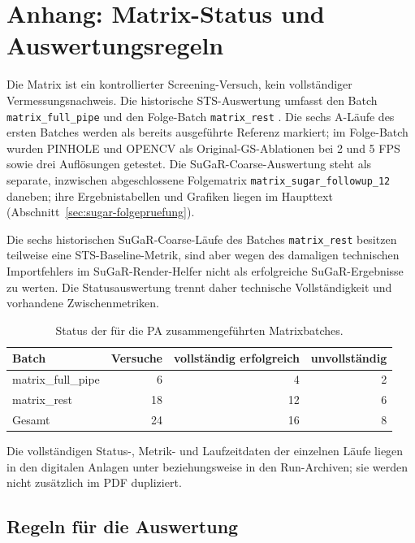 \section{Anhang: Matrix-Status und Auswertungsregeln}

Die Matrix ist ein kontrollierter Screening-Versuch, kein vollständiger
Vermessungsnachweis. Die historische STS-Auswertung umfasst den Batch
\texttt{matrix\_full\_pipe} und den Folge-Batch \texttt{matrix\_rest}
\parencite{matrixRestResults}. Die sechs A-Läufe des ersten Batches werden als
bereits ausgeführte Referenz markiert; im Folge-Batch wurden PINHOLE und
OPENCV als Original-GS-Ablationen bei 2 und 5 FPS sowie drei Auflösungen
getestet. Die SuGaR-Coarse-Auswertung steht als separate, inzwischen
abgeschlossene Folgematrix \texttt{matrix\_sugar\_followup\_12} daneben; ihre
Ergebnistabellen und Grafiken liegen im Haupttext
(Abschnitt~\ref{sec:sugar-folgepruefung}).

Die sechs historischen SuGaR-Coarse-Läufe des Batches
\texttt{matrix\_rest} besitzen teilweise eine STS-Baseline-Metrik, sind aber
wegen des damaligen technischen Importfehlers im SuGaR-Render-Helfer nicht als
erfolgreiche SuGaR-Ergebnisse zu werten. Die Statusauswertung trennt daher
technische Vollständigkeit und vorhandene Zwischenmetriken.

\begin{table}[H]
\centering
\small
\begin{tabular}{lrrr}
\toprule
Batch & Versuche & vollständig erfolgreich & unvollständig\\
\midrule
matrix\_full\_pipe & 6 & 4 & 2\\
matrix\_rest & 18 & 12 & 6\\
Gesamt & 24 & 16 & 8\\
\bottomrule
\end{tabular}
\caption{Status der für die PA zusammengeführten Matrixbatches.}
\label{tab:matrix-status}
\end{table}

Die vollständigen Status-, Metrik- und Laufzeitdaten der einzelnen Läufe
liegen in den digitalen Anlagen unter
beziehungsweise in den Run-Archiven; sie werden nicht zusätzlich im PDF
dupliziert.

\subsection*{Regeln für die Auswertung}

